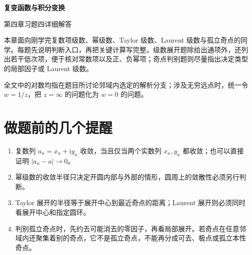 \documentclass[UTF8,11pt,a4paper,fontset=fandol]{ctexart}
\newcommand{\ii}{\mathrm{i}}
\begin{document}
\begin{center}
{\Large\bfseries 复变函数与积分变换\par}
\vspace{0.5em}
{\Large 第四章习题四详细解答\par}
\end{center}
\medskip
本章面向刚学完复数项级数、幂级数、Taylor 级数、Laurent 级数与孤立奇点的同学。每题先说明判断入口，再把关键计算写完整。级数展开题除给出通项外，还列出若干低次项，便于核对常数项以及正、负幂项；奇点判别题则尽量指出决定类型的局部因子或 Laurent 级数。

全文中的对数均指在题目所讨论邻域内选定的解析分支；涉及无穷远点时，统一令 $w=1/z$，把 $z=\infty$ 的问题化为 $w=0$ 的问题。

{\setlength{\parskip}{0pt}\tableofcontents}
\newpage

\section*{做题前的几个提醒}
\begin{enumerate}
\item 复数列 $a_n=x_n+\ii y_n$ 收敛，当且仅当两个实数列 $x_n,y_n$ 都收敛；也可以直接证明 $|a_n-a|\to0$。
\item 幂级数的收敛半径只决定开圆内部与外部的情形，圆周上的敛散性必须另行判断。
\item Taylor 展开的半径等于展开中心到最近奇点的距离；Laurent 展开则必须同时看展开中心和指定圆环。
\item 判别孤立奇点时，先约去可能消去的零因子，再看局部展开。若奇点在任意邻域内还聚集着别的奇点，它不是孤立奇点，不能再分成可去、极点或孤立本性奇点。
\end{enumerate}
\end{document}
